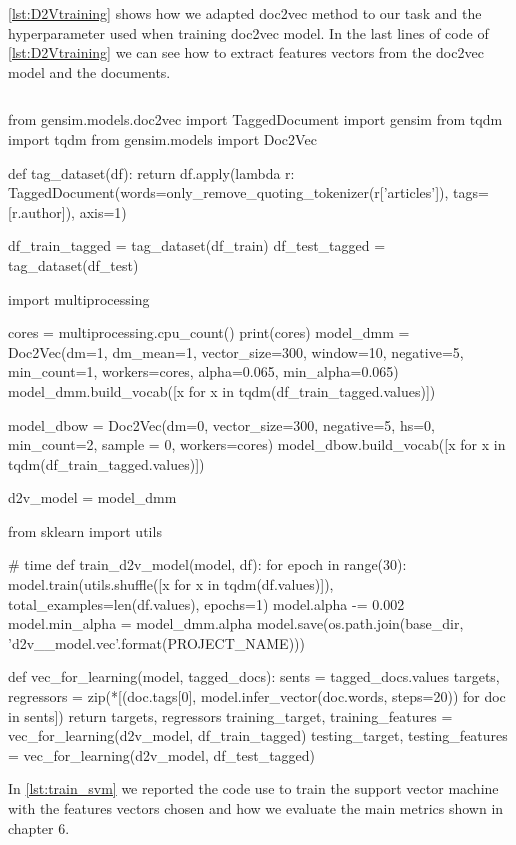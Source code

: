 \autoref{lst:D2Vtraining} shows how we adapted doc2vec method to our task and the hyperparameter used when training doc2vec model. In the last lines of code of \autoref{lst:D2Vtraining} we can see how to extract features vectors from the doc2vec model and the documents.
\begin{lstlisting}[frame=none,caption={D2V training and features extraction.},captionpos=b,label=lst:D2Vtraining]
\end{lstlisting}
\begin{python}	
	from gensim.models.doc2vec import TaggedDocument
	import gensim
	from tqdm import tqdm
	from gensim.models import Doc2Vec
	
	def tag_dataset(df):
	return df.apply(lambda r: TaggedDocument(words=only_remove_quoting_tokenizer(r['articles']), tags=[r.author]), axis=1)
	
	df_train_tagged = tag_dataset(df_train)
	df_test_tagged = tag_dataset(df_test)
	
	import multiprocessing
	
	cores = multiprocessing.cpu_count()
	print(cores)
	model_dmm = Doc2Vec(dm=1, dm_mean=1, vector_size=300, window=10, negative=5, min_count=1, workers=cores, alpha=0.065, min_alpha=0.065)
	model_dmm.build_vocab([x for x in tqdm(df_train_tagged.values)])
	
	model_dbow = Doc2Vec(dm=0, vector_size=300, negative=5, hs=0, min_count=2, sample = 0, workers=cores)
	model_dbow.build_vocab([x for x in tqdm(df_train_tagged.values)])
	
	d2v_model = model_dmm
	
	from sklearn import utils
	
	# time
	def train_d2v_model(model, df):
		for epoch in range(30):
			model.train(utils.shuffle([x for x in tqdm(df.values)]), total_examples=len(df.values), epochs=1)
			model.alpha -= 0.002
			model.min_alpha = model_dmm.alpha
		model.save(os.path.join(base_dir, 'd2v_{}_model.vec'.format(PROJECT_NAME)))
	
	def vec_for_learning(model, tagged_docs):
		sents = tagged_docs.values
		targets, regressors = zip(*[(doc.tags[0], model.infer_vector(doc.words, steps=20)) for doc in sents])
		return targets, regressors
	training_target, training_features = vec_for_learning(d2v_model, df_train_tagged)
	testing_target, testing_features = vec_for_learning(d2v_model, df_test_tagged)
	
\end{python}


In \autoref{lst:train_svm} we reported the code use to train the support vector machine with the features vectors chosen and how we evaluate the main metrics shown in chapter 6.

